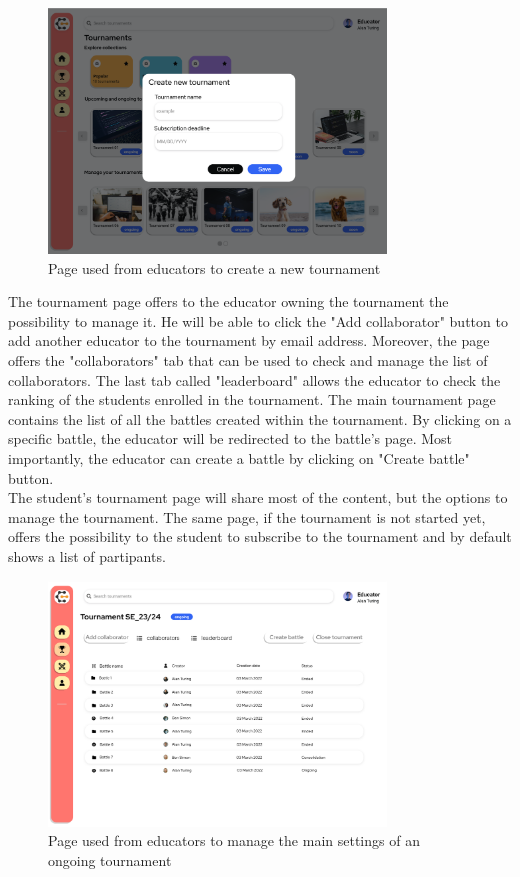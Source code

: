 \begin{figure}[H]
    \centering
    \includegraphics[width=0.8\textwidth]{Mockups/6_educator_create_tournament.png}
    \caption{Page used from educators to create a new tournament}
\end{figure}
The tournament page offers to the educator owning the tournament the possibility to manage it. He will be able to click the "Add collaborator" button to add another educator to the tournament by email address. Moreover, the page offers the "collaborators" tab that can be used to check and manage the list of collaborators. The last tab called "leaderboard" allows the educator to check the ranking of the students enrolled in the tournament. The main tournament page contains the list of all the battles created within the tournament.  By clicking on a specific battle, the educator will be redirected to the battle's page. Most importantly, the educator can create a battle by clicking on "Create battle" button.\\
The student's tournament page will share most of the content, but the options to manage the tournament. The same page, if the tournament is not started yet, offers the possibility to the student to subscribe to the tournament and by default shows a list of partipants. \\
\begin{figure}[H]
    \centering
    \includegraphics[width=0.8\textwidth]{Mockups/7_educator_manages_tournament.png}
    \caption{Page used from educators to manage the main settings of an ongoing tournament}
\end{figure}
